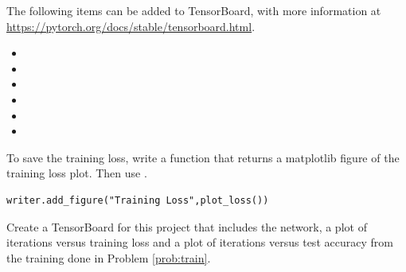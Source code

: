 The following items can be added to TensorBoard, with more information at \url{https://pytorch.org/docs/stable/tensorboard.html}.

\begin{itemize}
\item {}
\item {}
\item {}
\item {}
\item {}
\item {}
\end{itemize}

To save the training loss, write a function that returns a matplotlib figure of the training loss plot.
Then use .

\begin{lstlisting}
writer.add_figure("Training Loss",plot_loss())
\end{lstlisting}

\begin{problem}
Create a TensorBoard for this project that includes the network, a plot of iterations versus training loss and a plot of iterations versus test accuracy from the training done in Problem \ref{prob:train}.
\end{problem}
